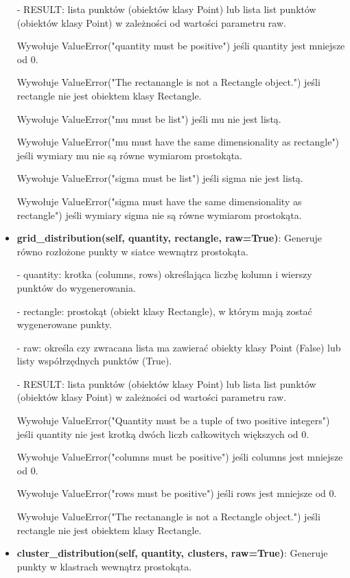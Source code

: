 \documentclass{lab}
\begin{document}
\begin{itemize}
  - RESULT: lista punktów (obiektów klasy Point) lub lista list punktów (obiektów klasy Point) w zależności od wartości parametru raw.

  Wywołuje ValueError("quantity must be positive") jeśli quantity jest mniejsze od 0.

  Wywołuje ValueError("The rectanangle is not a Rectangle object.") jeśli rectangle nie jest obiektem klasy Rectangle.

  Wywołuje ValueError("mu must be list") jeśli mu nie jest listą.

  Wywołuje ValueError("mu must have the same dimensionality as rectangle") jeśli wymiary mu nie są równe wymiarom prostokąta.

  Wywołuje ValueError("sigma must be list") jeśli sigma nie jest listą.

  Wywołuje ValueError("sigma must have the same dimensionality as rectangle") jeśli wymiary sigma nie są równe wymiarom prostokąta.

  \item \textbf{grid\_distribution(self, quantity, rectangle, raw=True)}:
  Generuje równo rozłożone punkty w siatce wewnątrz prostokąta.

  - quantity: krotka (columns, rows) określająca liczbę kolumn i wierszy punktów do wygenerowania.

  - rectangle: prostokąt (obiekt klasy Rectangle), w którym mają zostać wygenerowane punkty.

  - raw: określa czy zwracana lista ma zawierać obiekty klasy Point (False) lub listy współrzędnych punktów (True).

  - RESULT: lista punktów (obiektów klasy Point) lub lista list punktów (obiektów klasy Point) w zależności od wartości parametru raw.

  Wywołuje ValueError("Quantity must be a tuple of two positive integers") jeśli quantity nie jest krotką dwóch liczb całkowitych większych od 0.

  Wywołuje ValueError("columns must be positive") jeśli columns jest mniejsze od 0.

  Wywołuje ValueError("rows must be positive") jeśli rows jest mniejsze od 0.

  Wywołuje ValueError("The rectanangle is not a Rectangle object.") jeśli rectangle nie jest obiektem klasy Rectangle.

  \item \textbf{cluster\_distribution(self, quantity, clusters, raw=True)}:
  Generuje punkty w klastrach wewnątrz prostokąta.


\end{itemize}
\end{document}
